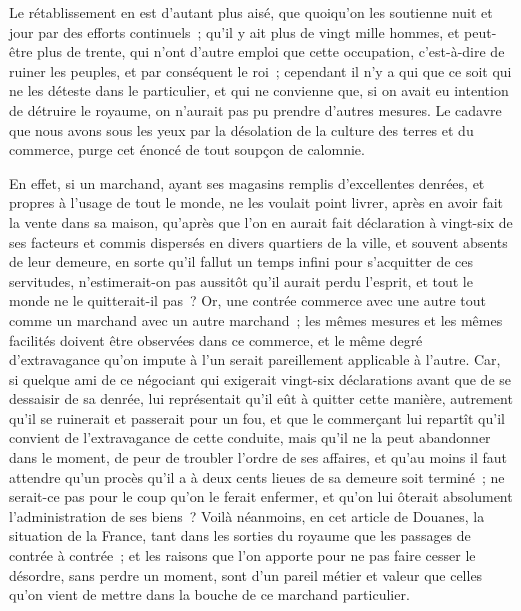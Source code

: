 \documentclass[french,twoside]{book} %
\begin{document}
Le rétablissement en est d’autant plus aisé, que quoiqu’on les soutienne nuit et jour par des efforts continuels ; qu’il y ait plus de vingt mille hommes, et peut-être plus de trente, qui n’ont d’autre emploi que cette occupation, c’est-à-dire de ruiner les peuples, et par conséquent le roi ; cependant il n’y a qui que ce soit qui ne les déteste dans le particulier, et qui ne convienne que, si on avait eu intention de détruire le royaume, on n’aurait pas pu prendre d’autres mesures. Le cadavre que nous avons sous les yeux par la désolation de la culture des terres et du commerce, purge cet énoncé de tout soupçon de calomnie.\par
En effet, si un marchand, ayant ses magasins remplis d’excellentes denrées, et propres à l’usage de tout le monde, ne les voulait point livrer, après en avoir fait la vente dans sa maison, qu’après que l’on en aurait fait déclaration à vingt-six de ses facteurs et commis dispersés en divers quartiers de la ville, et souvent absents de leur demeure, en sorte qu’il fallut un temps infini pour s’acquitter de ces servitudes, n’estimerait-on pas aussitôt qu’il aurait perdu l’esprit, et tout le monde ne le quitterait-il pas ? Or, une contrée commerce avec une autre tout comme un marchand avec un autre marchand ; les mêmes mesures et les mêmes facilités doivent être observées dans ce commerce, et le même degré d’extravagance qu’on impute à l’un serait pareillement applicable à l’autre. Car, si quelque ami de ce négociant qui exigerait vingt-six déclarations avant que de se dessaisir de sa denrée, lui représentait qu’il eût à quitter cette manière, autrement qu’il se ruinerait et passerait pour un fou, et que le commerçant lui repartît qu’il convient de l’extravagance de cette conduite, mais qu’il ne la peut abandonner dans le moment, de peur de troubler l’ordre de ses affaires, et qu’au moins il faut attendre qu’un procès qu’il a à deux cents lieues de sa demeure soit terminé ; ne serait-ce pas pour le coup qu’on le ferait enfermer, et qu’on lui ôterait absolument l’administration de ses biens ? Voilà néanmoins, en cet article de Douanes, la situation de la France, tant dans les sorties du royaume que les passages de contrée à contrée ; et les raisons que l’on apporte pour ne pas faire cesser le désordre, sans perdre un moment, sont d’un pareil métier et valeur que celles qu’on vient de mettre dans la bouche de ce marchand particulier.\par
\end{document}
